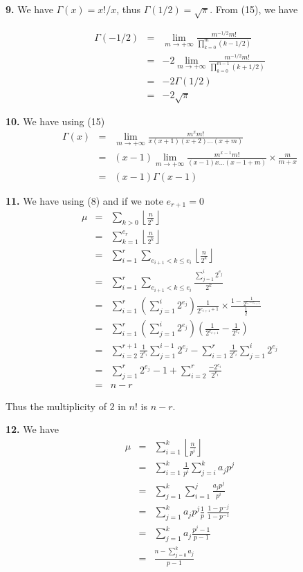 \documentclass[a4paper,12pt]{article}
\newcommand{\newpar}[1]{\bigskip \noindent \textbf{#1.}}
\begin{document}
\newpar{9}  We have $\Gamma(x) = x!/x$, thus $\Gamma(1/2) =
\sqrt{\pi}$.  From (15), we have

\begin{eqnarray*}
  \Gamma(-1/2) &=& \lim_{m\to +\infty} \frac{m^{-1/2}
    m!}{\prod_{k=0}^m (k-1/2)} \\
  &=& -2\lim_{m\to +\infty} \frac{m^{-1/2}m!}{\prod_{k=0}^{m-1}(k +
    1/2)} \\
  &=& -2 \Gamma(1/2) \\
  &=& -2 \sqrt{\pi}
\end{eqnarray*}

\newpar{10} We have using (15)
\begin{eqnarray*}
  \Gamma(x) &=& \lim_{m\to +\infty} \frac{m^x m!}{x(x+1)(x+2)\ldots
    (x+m)} \\
  &=& (x-1) \lim_{m \to +\infty} \frac{m^{x-1} m!}{(x-1)x \ldots
    (x-1+m)} \times \frac{m}{m+x} \\
  &=& (x-1) \Gamma(x-1)
\end{eqnarray*}

\newpar{11} We have using (8) and if we note $e_{r+1} = 0$
\begin{eqnarray*}
  \mu &=& \sum_{k>0} \left\lfloor \frac{n}{2^k} \right\rfloor \\
  &=& \sum_{k=1}^{e_r} \left\lfloor \frac{n}{2^k} \right\rfloor \\
  &=& \sum_{i=1}^r \sum_{e_{i+1} < k \le e_i} \left\lfloor
  \frac{n}{2^k} \right\rfloor \\
  &=& \sum_{i=1}^r \sum_{e_{i+1} < k\le e_i} \frac{\sum_{j=1}^i
    2^{e_j}}{2^k} \\
  &=& \sum_{i=1}^r \left(\sum_{j=1}^i 2^{e_j}\right)
  \frac{1}{2^{e_{i+1}+1}} \times \frac{1 - \frac{1}{2^{e_i -
        e_{i+1}}}}{\frac{1}{2}} \\
  &=& \sum_{i=1}^r \left(\sum_{j=1}^i 2^{e_j}\right) \left(
  \frac{1}{2^{e_{i+1}}} - \frac{1}{2^{e_i}} \right) \\
  &=& \sum_{i=2}^{r+1} \frac{1}{2^{e_i}} \sum_{j=1}^{i-1} 2^{e_j} -
  \sum_{i=1}^r \frac{1}{2^{e_i}} \sum_{j=1}^i 2^{e_j} \\
  &=& \sum_{j=1}^r 2^{e_j} - 1 + \sum_{i=2}^r \frac{-
    2^{e_i}}{2^{e_i}} \\
  &=& n - r
\end{eqnarray*}

Thus the multiplicity of $2$ in $n!$ is $n-r$.

\newpar{12} We have
\begin{eqnarray*}
  \mu &=& \sum_{i=1}^k \left\lfloor \frac{n}{p^i} \right\rfloor \\
  &=& \sum_{i=1}^k \frac{1}{p^i} \sum_{j=i}^k a_j p^j \\
  &=& \sum_{j=1}^k \sum_{i=1}^j \frac{a_j p^j}{p^i} \\
  &=& \sum_{j=1}^k a_j p^j \frac{1}{p}\ \frac{1 - p^{-j}}{1 -
    p^{-1}}\\
  &=& \sum_{j=1}^k a_j \frac{p^j - 1}{p-1} \\
  &=& \frac{n - \sum_{j=0}^k a_j}{p-1}
\end{eqnarray*}
\end{document}
